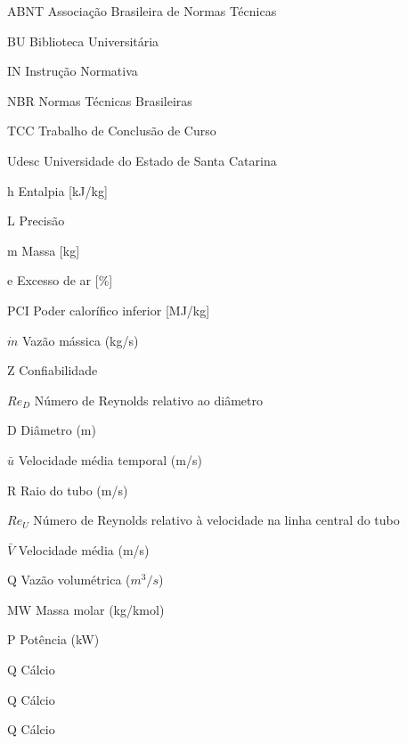 
\listoffigures*
\cleardoublepage



\listoftables*
\cleardoublepage

\begin{siglas}
	\item[ABNT] Associação Brasileira de Normas Técnicas
	\item[BU] Biblioteca Universitária
	\item[IN] Instrução Normativa
	\item[NBR] Normas Técnicas Brasileiras
	\item[TCC] Trabalho de Conclusão de Curso
	\item[Udesc] Universidade do Estado de Santa Catarina
\end{siglas}



\begin{simbolos}
  \item[h] Entalpia [kJ/kg]
  \item[L] Precisão
  \item[m] Massa [kg]
  \item[e] Excesso de ar [\%]
  \item[PCI] Poder calorífico inferior [MJ/kg]
  \item[$\dot{m}$] Vazão mássica (kg/s)
  \item[Z] Confiabilidade
  \item[$Re_D$] Número de Reynolds relativo ao diâmetro
  \item[D] Diâmetro (m)
  \item[$\bar{u}$] Velocidade média temporal (m/s)
  \item[R] Raio do tubo (m/s)
  \item[$Re_U$] Número de Reynolds relativo à velocidade na linha central do tubo
  \item[$\bar{V}$] Velocidade média (m/s)
  \item[Q] Vazão volumétrica ($m^3/s$)
  \item[MW] Massa molar (kg/kmol)
  \item[P] Potência (kW)
  \item[Q] Cálcio
  \item[Q] Cálcio
  \item[Q] Cálcio
\end{simbolos}


